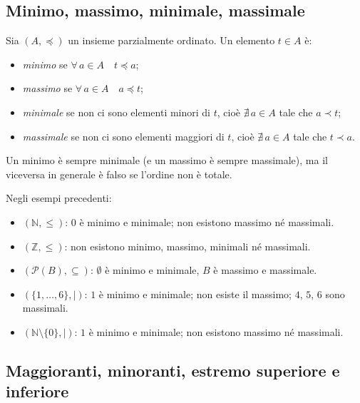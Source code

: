 \documentclass[11pt,a4paper]{article}
\begin{document}
\subsection{Minimo, massimo, minimale, massimale}

\begin{definizione}
Sia $(A, \preceq)$ un insieme parzialmente ordinato. Un elemento $t \in A$ è:
\begin{itemize}
    \item \emph{minimo} se $\forall\, a \in A \quad t \preceq a$;
    \item \emph{massimo} se $\forall\, a \in A \quad a \preceq t$;
    \item \emph{minimale} se non ci sono elementi minori di $t$, cioè
          $\nexists\, a \in A$ tale che $a \prec t$;
    \item \emph{massimale} se non ci sono elementi maggiori di $t$, cioè
          $\nexists\, a \in A$ tale che $t \prec a$.
\end{itemize}
\end{definizione}

Un minimo è sempre minimale (e un massimo è sempre massimale), ma il
viceversa in generale è falso se l'ordine non è totale.

\begin{esempio}
Negli esempi precedenti:
\begin{itemize}
    \item $(\mathbb{N}, \leq)$: $0$ è minimo e minimale; non esistono
          massimo né massimali.
    \item $(\mathbb{Z}, \leq)$: non esistono minimo, massimo, minimali né
          massimali.
    \item $(\mathcal{P}(B), \subseteq)$: $\emptyset$ è minimo e minimale,
          $B$ è massimo e massimale.
    \item $(\{1, \dots, 6\}, \mid)$: $1$ è minimo e minimale; non esiste
          il massimo; $4$, $5$, $6$ sono massimali.
    \item $(\mathbb{N} \setminus \{0\}, \mid)$: $1$ è minimo e minimale;
          non esistono massimo né massimali.
\end{itemize}
\end{esempio}

\subsection{Maggioranti, minoranti, estremo superiore e inferiore}
\end{document}
